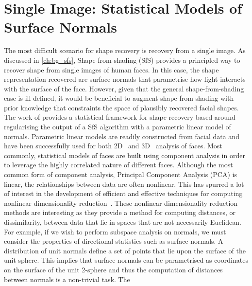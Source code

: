 \chapter{Single Image: Statistical Models of Surface Normals}\label{ch:singl_imag}
\minitoc{}
The most difficult scenario for shape recovery is recovery from a single
image. As discussed in \cref{ch:bg_sfs}, Shape-from-shading (SfS) provides a
principled way to recover shape from single images of human faces. In this case,
the shape representation recovered are surface normals that parametrise how
light interacts with the surface of the face. However, given that the general
shape-from-shading case is ill-defined, it would be beneficial to augment 
shape-from-shading with prior knowledge that constraints the space of plausibly
recovered facial shapes. The work of \citet{smith2006recovering,smith2008facial}
provides a statistical framework for shape recovery based around regularising
the output of a SfS algorithm with a parametric linear model of normals. 
Parametric linear models are readily constructed from facial data and have 
been successfully used for both 2D~\cite{cootes2001active,turk1991eigenfaces} 
and 3D~\cite{enciso1999synthesis,atick1996statistical} analysis of faces. 
Most commonly, statistical models of faces are built using component analysis
in order to leverage the highly correlated nature of different faces. Although
the most common form of component analysis, Principal Component Analysis (PCA)
is linear, the relationships between data are often nonlinear.  
This has spurred a lot of interest in the development of
efficient and effective techniques for computing nonlinear dimensionality
reduction~\cite{yang2005kpca,goudelis2007class,scholkopf1998nonlinear}. These
nonlinear dimensionality reduction methods are interesting as they provide
a method for computing distances, or dissimilarity, between data that
lie in spaces that are not necessarily Euclidean. For example, if we wish to
perform subspace analysis on normals, we must consider the properties of 
directional statistics such as surface normals.
A distribution of unit normals define a set of points that lie upon the
surface of the unit sphere. This implies that surface normals can be
parametrised as coordinates on the surface of the unit 2-sphere and thus 
the computation of distances between normals is a non-trivial task. The
